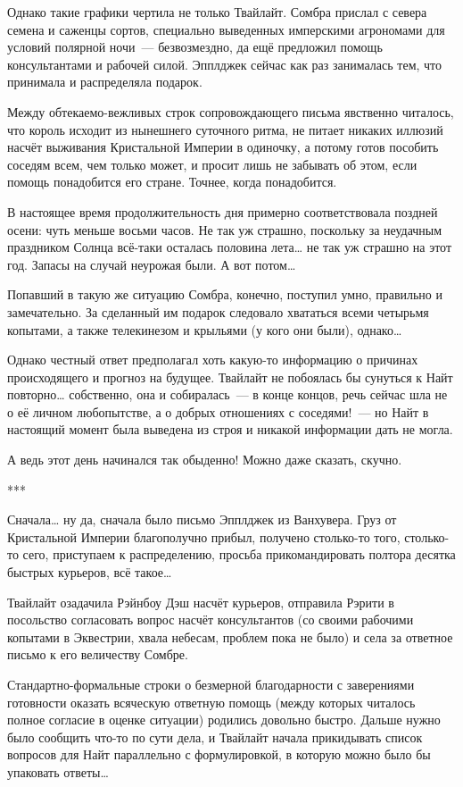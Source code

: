 \documentclass[twoside,a5paper,12pt]{extbook}
\begin{document}
Однако такие графики чертила не только Твайлайт. Сомбра прислал с севера семена и саженцы сортов, специально выведенных имперскими агрономами для условий полярной ночи — безвозмездно, да ещё предложил помощь консультантами и рабочей силой. Эпплджек сейчас как раз занималась тем, что принимала и распределяла подарок.

Между обтекаемо-вежливых строк сопровождающего письма явственно читалось, что король исходит из нынешнего суточного ритма, не питает никаких иллюзий насчёт выживания Кристальной Империи в одиночку, а потому готов пособить соседям всем, чем только может, и просит лишь не забывать об этом, если помощь понадобится его стране. Точнее, когда понадобится.

В настоящее время продолжительность дня примерно соответствовала поздней осени: чуть меньше восьми часов. Не так уж страшно, поскольку за неудачным праздником Солнца всё-таки осталась половина лета… не так уж страшно на этот год. Запасы на случай неурожая были. А вот потом…

Попавший в такую же ситуацию Сомбра, конечно, поступил умно, правильно и замечательно. За сделанный им подарок следовало хвататься всеми четырьмя копытами, а также телекинезом и крыльями (у кого они были), однако…

Однако честный ответ предполагал хоть какую-то информацию о причинах происходящего и прогноз на будущее. Твайлайт не побоялась бы сунуться к Найт повторно… собственно, она и собиралась — в конце концов, речь сейчас шла не о её личном любопытстве, а о добрых отношениях с соседями! — но Найт в настоящий момент была выведена из строя и никакой информации дать не могла.

А ведь этот день начинался так обыденно! Можно даже сказать, скучно.

***

Сначала… ну да, сначала было письмо Эпплджек из Ванхувера. Груз от Кристальной Империи благополучно прибыл, получено столько-то того, столько-то сего, приступаем к распределению, просьба прикомандировать полтора десятка быстрых курьеров, всё такое…

Твайлайт озадачила Рэйнбоу Дэш насчёт курьеров, отправила Рэрити в посольство согласовать вопрос насчёт консультантов (со своими рабочими копытами в Эквестрии, хвала небесам, проблем пока не было) и села за ответное письмо к его величеству Сомбре.

Стандартно-формальные строки о безмерной благодарности с заверениями готовности оказать всяческую ответную помощь (между которых читалось полное согласие в оценке ситуации) родились довольно быстро. Дальше нужно было сообщить что-то по сути дела, и Твайлайт начала прикидывать список вопросов для Найт параллельно с формулировкой, в которую можно было бы упаковать ответы…
\end{document}
